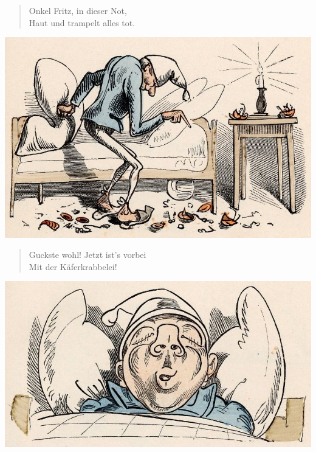 \documentclass[a4paper,12pt]{article}
\begin{document}
\begin{verse}
Onkel Fritz, in dieser Not,\\{}
Haut und trampelt alles tot.
\end{verse}



\begin{center}\includegraphics[scale=.7, alt={... und trampelt alles tot}]{images/5-14.jpg}\end{center}



\begin{verse}
Guckste wohl! Jetzt ist's vorbei\\{}
Mit der Käferkrabbelei!
\end{verse}



\begin{center}\includegraphics[scale=.7, alt={wieder Ruhe}]{images/5-15.jpg}\end{center}
\end{document}
